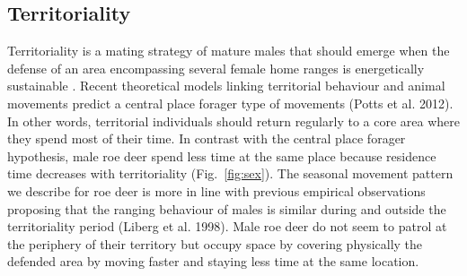 \documentclass[a4paper,11pt]{article}
\begin{document}

\subsection*{Territoriality}

Territoriality is a mating strategy of mature males that should emerge
when the defense of an area encompassing several female home ranges is
energetically sustainable \citep{Emlen1977}. Recent theoretical models linking territorial behaviour and animal movements predict a central place forager type of movements
(Potts et al. 2012). In other words, territorial individuals
should return regularly to a core area where they spend most of their
time. In contrast with the central place forager hypothesis, male roe
deer spend less time at the same place because residence time
decreases with territoriality (Fig.~\ref{fig:sex}). The seasonal movement pattern we describe for roe deer is more in line with previous empirical observations proposing that the ranging behaviour of males is similar during and outside the territoriality period (Liberg et al. 1998). Male roe deer do not seem to patrol at the periphery of their territory but occupy space by covering physically the defended area by moving faster and staying less time at the same location.

\end{document}
